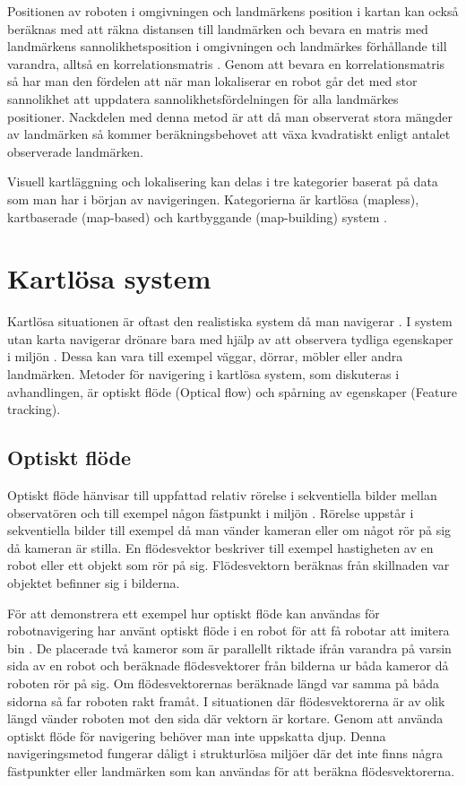 Positionen av roboten i omgivningen och landmärkens position i kartan kan också beräknas med att räkna distansen till landmärken och bevara en matris med landmärkens sannolikhetsposition i omgivningen och landmärkes förhållande till varandra, alltså en korrelationsmatris \citep{realslamproblem, ProbabilisticRobotics}. Genom att bevara en korrelationsmatris så har man den fördelen att när man lokaliserar en robot går det med stor sannolikhet att uppdatera sannolikhetsfördelningen för alla landmärkes positioner. Nackdelen med denna metod är att då man observerat stora mängder av landmärken så kommer beräkningsbehovet att växa kvadratiskt enligt antalet observerade landmärken. 

Visuell kartläggning och lokalisering kan delas i tre kategorier baserat på data som man har i början av navigeringen. Kategorierna är kartlösa (mapless), kartbaserade (map-based) och kartbyggande (map-building) system \citep{geospatial}. 

\section{Kartlösa system}

Kartlösa situationen är oftast den realistiska system då man navigerar \citep{ProbabilisticRobotics}. I system utan karta navigerar drönare bara med hjälp av att observera tydliga egenskaper i miljön \citep{982903}. Dessa kan vara till exempel väggar, dörrar, möbler eller andra landmärken. Metoder för navigering i kartlösa system, som diskuteras i avhandlingen, är optiskt flöde (Optical flow) och spårning av egenskaper (Feature tracking). 

\subsection{Optiskt flöde}

Optiskt flöde hänvisar till uppfattad relativ rörelse i sekventiella bilder mellan observatören och till exempel någon fästpunkt i miljön \citep{opticalflowuav}. Rörelse uppstår i sekventiella bilder till exempel då man vänder kameran eller om något rör på sig då kameran är stilla. En flödesvektor beskriver till exempel hastigheten av en robot eller ett objekt som rör på sig. Flödesvektorn beräknas från skillnaden var objektet befinner sig i bilderna.

För att demonstrera ett exempel hur optiskt flöde kan användas för robotnavigering har \cite{341094} använt optiskt flöde i en robot för att få robotar att imitera bin \citep{341094}. De placerade två kameror som är parallellt riktade ifrån varandra på varsin sida av en robot och beräknade flödesvektorer från bilderna ur båda kameror då roboten rör på sig. Om flödesvektorernas beräknade längd var samma på båda sidorna så far roboten rakt framåt. I situationen där flödesvektorerna är av olik längd vänder roboten mot den sida där vektorn är kortare. Genom att använda optiskt flöde för navigering behöver man inte uppskatta djup. Denna navigeringsmetod fungerar dåligt i strukturlösa miljöer där det inte finns några fästpunkter eller landmärken som kan användas för att beräkna flödesvektorerna.

